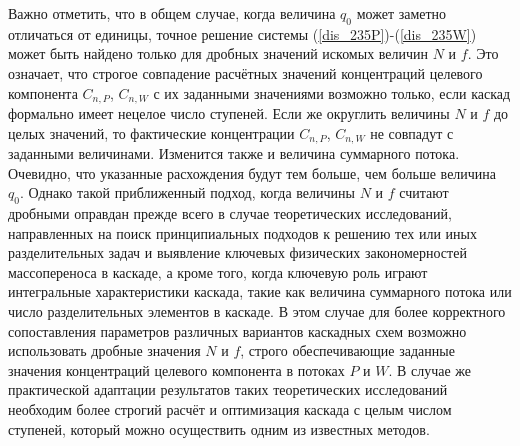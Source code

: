 Важно отметить, что в общем случае, когда величина $q_0$ может заметно отличаться от единицы, точное решение системы (\ref{dis_235P})-(\ref{dis_235W}) может быть найдено только для дробных значений искомых величин $N$ и $f$. Это означает, что строгое совпадение расчётных значений концентраций целевого компонента $C_{n,P}$, $C_{n,W}$ с их заданными значениями возможно только, если каскад формально имеет нецелое число ступеней. Если же округлить величины $N$ и $f$ до целых значений, то  фактические концентрации $C_{n,P}$, $C_{n,W}$ не совпадут с заданными величинами. Изменится также и величина суммарного потока. Очевидно, что указанные расхождения будут тем больше, чем больше величина $q_0$. Однако такой приближенный подход, когда величины $N$ и $f$ считают дробными оправдан прежде всего в случае теоретических исследований, направленных на поиск принципиальных подходов к решению тех или иных разделительных задач и выявление ключевых физических закономерностей массопереноса в каскаде, а кроме того, когда ключевую роль играют интегральные характеристики каскада, такие как величина суммарного потока или число разделительных элементов в каскаде. В этом случае для более корректного сопоставления параметров различных вариантов каскадных схем возможно использовать дробные значения $N$ и $f$, строго обеспечивающие заданные значения концентраций целевого компонента в потоках $P$ и $W$. В случае же практической адаптации результатов таких теоретических исследований необходим более строгий расчёт и оптимизация каскада с целым числом ступеней, который можно осуществить одним из известных методов.   
